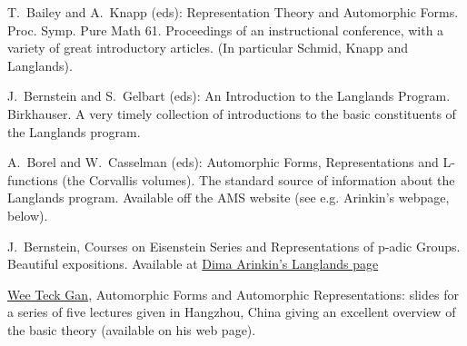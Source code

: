 \documentclass[11pt,leqno]{article}
\theoremstyle{plain}
\theoremstyle{definition}
\numberwithin{equation}{section}
\numberwithin{lem}{section}
\begin{document}
{T.~Bailey and A.~Knapp (eds): Representation Theory and Automorphic Forms. Proc. Symp. Pure Math 61. Proceedings of an instructional conference, with a variety of great introductory articles. (In particular Schmid, Knapp and Langlands).

J.~Bernstein and S.~Gelbart (eds): An Introduction to the Langlands Program. Birkhauser. A very timely collection of introductions to the basic constituents of the Langlands program.

A.~Borel and W.~Casselman (eds): Automorphic Forms, Representations and L-functions (the Corvallis volumes). The standard source of information about the Langlands program. Available off the AMS website (see e.g. Arinkin's webpage, below).

J.~Bernstein, Courses on Eisenstein Series and Representations of p-adic Groups. Beautiful expositions. Available at \href{http://www.math.uchicago.edu/~arinkin/langlands}{Dima Arinkin's Langlands page}

\href{http://www.math.ucsd.edu/~wgan}{Wee Teck Gan}, Automorphic Forms and Automorphic Representations: slides for a series of five lectures given in Hangzhou, China giving an excellent overview of the basic theory (available on his web page).}





\end{document}

